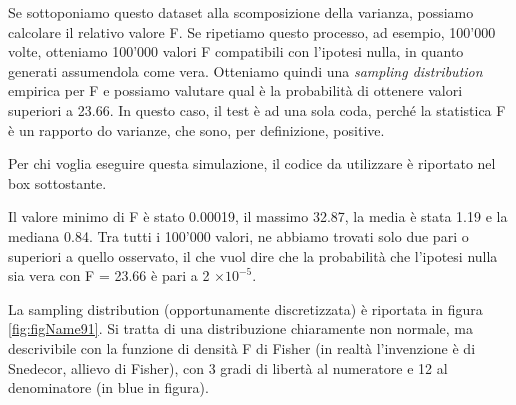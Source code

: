 \documentclass[a4paper,12pt,oneside]{book}
\newenvironment{Shaded}{\begin{snugshade}}{\end{snugshade}}
\newcommand{\CommentTok}[1]{#1}
\begin{document}
Se sottoponiamo questo dataset alla scomposizione della varianza, possiamo calcolare il relativo valore F. Se ripetiamo questo processo, ad esempio, 100'000 volte, otteniamo 100'000 valori F compatibili con l'ipotesi nulla, in quanto generati assumendola come vera. Otteniamo quindi una \emph{sampling distribution} empirica per F e possiamo valutare qual è la probabilità di ottenere valori superiori a 23.66. In questo caso, il test è ad una sola coda, perché la statistica F è un rapporto do varianze, che sono, per definizione, positive.

Per chi voglia eseguire questa simulazione, il codice da utilizzare è riportato nel box sottostante.

\begin{Shaded}
\end{Shaded}

Il valore minimo di F è stato 0.00019, il massimo 32.87, la media è stata 1.19 e la mediana 0.84. Tra tutti i 100'000 valori, ne abbiamo trovati solo due pari o superiori a quello osservato, il che vuol dire che la probabilità che l'ipotesi nulla sia vera con F = 23.66 è pari a 2 \(\times 10^{-5}\).

La sampling distribution (opportunamente discretizzata) è riportata in figura \ref{fig:figName91}. Si tratta di una distribuzione chiaramente non normale, ma descrivibile con la funzione di densità F di Fisher (in realtà l'invenzione è di Snedecor, allievo di Fisher), con 3 gradi di libertà al numeratore e 12 al denominatore (in blue in figura).
\end{document}
